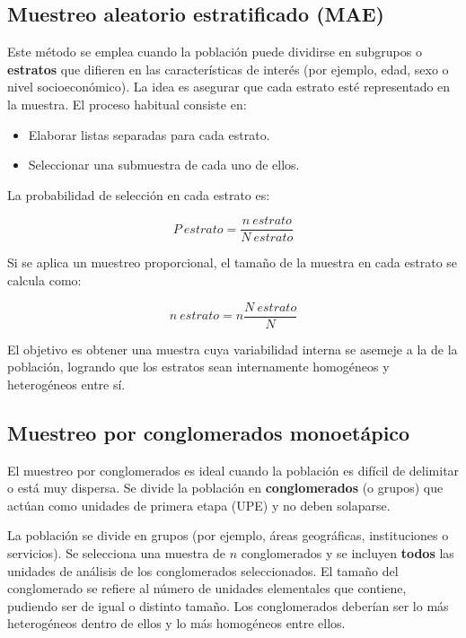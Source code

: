 \documentclass[
  spanish,
  a4paper,
]{scrbook}
\begin{document}
\subsection{Muestreo aleatorio estratificado
(MAE)}\label{muestreo-aleatorio-estratificado-mae}

Este método se emplea cuando la población puede dividirse en subgrupos o
\textbf{estratos} que difieren en las características de interés (por
ejemplo, edad, sexo o nivel socioeconómico). La idea es asegurar que
cada estrato esté representado en la muestra. El proceso habitual
consiste en:

\begin{itemize}
\item
  Elaborar listas separadas para cada estrato.
\item
  Seleccionar una submuestra de cada uno de ellos.
\end{itemize}

La probabilidad de selección en cada estrato es:

\[
P \ estrato = \frac{n \ estrato}{N \ estrato} 
\]

Si se aplica un muestreo proporcional, el tamaño de la muestra en cada
estrato se calcula como:

\[
n \ estrato = n\frac{N \ estrato}{N} 
\]

El objetivo es obtener una muestra cuya variabilidad interna se asemeje
a la de la población, logrando que los estratos sean internamente
homogéneos y heterogéneos entre sí.

\subsection{Muestreo por conglomerados
monoetápico}\label{muestreo-por-conglomerados-monoetuxe1pico}

El muestreo por conglomerados es ideal cuando la población es difícil de
delimitar o está muy dispersa. Se divide la población en
\textbf{conglomerados} (o grupos) que actúan como unidades de primera
etapa (UPE) y no deben solaparse.

La población se divide en grupos (por ejemplo, áreas geográficas,
instituciones o servicios). Se selecciona una muestra de \(n\)
conglomerados y se incluyen \textbf{todos} las unidades de análisis de
los conglomerados seleccionados. El tamaño del conglomerado se refiere
al número de unidades elementales que contiene, pudiendo ser de igual o
distinto tamaño. Los conglomerados deberían ser lo más heterogéneos
dentro de ellos y lo más homogéneos entre ellos.
\end{document}
